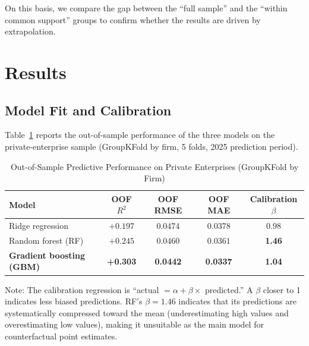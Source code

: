 \documentclass[11pt,a4paper]{article}
\begin{document}
On this basis, we compare the gap between the ``full sample'' and the ``within common support'' groups to confirm whether the results are driven by extrapolation.

\section{Results}

\subsection{Model Fit and Calibration}

Table~\ref{tab:perf} reports the out-of-sample performance of the three models on the private-enterprise sample (GroupKFold by firm, 5 folds, 2025 prediction period).

\begin{table}[htbp]
\centering
\caption{Out-of-Sample Predictive Performance on Private Enterprises (GroupKFold by Firm)}
\label{tab:perf}
\begin{threeparttable}
\small
\begin{tabular}{lcccc}
\toprule
Model & OOF $R^2$ & OOF RMSE & OOF MAE & Calibration $\beta$ \\
\midrule
Ridge regression & $+0.197$ & $0.0474$ & $0.0378$ & $0.98$ \\
Random forest (RF) & $+0.245$ & $0.0460$ & $0.0361$ & \textbf{1.46} \\
\textbf{Gradient boosting (GBM)} & \textbf{+0.303} & \textbf{0.0442} & \textbf{0.0337} & \textbf{1.04} \\
\bottomrule
\end{tabular}
\begin{tablenotes}
\footnotesize\raggedright
\item Note: The calibration regression is ``actual $=\alpha+\beta\times$ predicted.'' A $\beta$ closer to 1 indicates less biased predictions. RF's $\beta=1.46$ indicates that its predictions are systematically compressed toward the mean (underestimating high values and overestimating low values), making it unsuitable as the main model for counterfactual point estimates.
\end{tablenotes}
\end{threeparttable}
\end{table}
\end{document}
